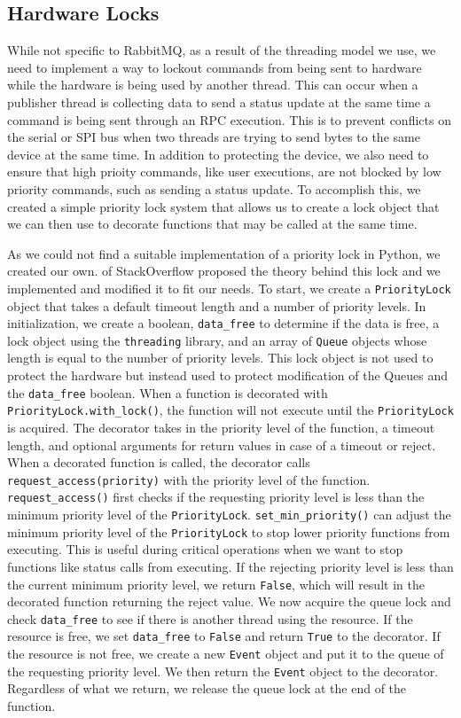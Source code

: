 \subsection{Hardware Locks}
While not specific to RabbitMQ, as a result of the threading model we use, we need to implement a way to lockout commands from being sent to hardware while the hardware is being used by another thread. 
This can occur when a publisher thread is collecting data to send a status update at the same time a command is being sent through an RPC execution.
This is to prevent conflicts on the serial or SPI bus when two threads are trying to send bytes to the same device at the same time.
In addition to protecting the device, we also need to ensure that high prioity commands, like user executions, are not blocked by low priority commands, such as sending a status update.
To accomplish this, we created a simple priority lock system that allows us to create a lock object that we can then use to decorate functions that may be called at the same time.

As we could not find a suitable implementation of a priority lock in Python, we created our own.
\cite{prioritylock} of StackOverflow proposed the theory behind this lock and we implemented and modified it to fit our needs.
To start, we create a \texttt{PriorityLock} object that takes a default timeout length and a number of priority levels.
In initialization, we create a boolean, \texttt{data\_free} to determine if the data is free, a lock object using the \texttt{threading} library, and an array of \texttt{Queue} objects whose length is equal to the number of priority levels.
This lock object is not used to protect the hardware but instead used to protect modification of the Queues and the \texttt{data\_free} boolean.
When a function is decorated with \texttt{PriorityLock.with\_lock()}, the function will not execute until the \texttt{PriorityLock} is acquired.
The decorator takes in the priority level of the function, a timeout length, and optional arguments for return values in case of a timeout or reject. 
When a decorated function is called, the decorator calls \texttt{request\_access(priority)} with the priority level of the function.
\texttt{request\_access()} first checks if the requesting priority level is less than the minimum priority level of the \texttt{PriorityLock}.
\texttt{set\_min\_priority()} can adjust the minimum priority level of the \texttt{PriorityLock} to stop lower priority functions from executing.
This is useful during critical operations when we want to stop functions like status calls from executing.
If the rejecting priority level is less than the current minimum priority level, we return \texttt{False}, which will result in the decorated function returning the reject value.
We now acquire the queue lock and check \texttt{data\_free} to see if there is another thread using the resource. 
If the resource is free, we set \texttt{data\_free} to \texttt{False} and return \texttt{True} to the decorator.
If the resource is not free, we create a new \texttt{Event} object and put it to the queue of the requesting priority level.
We then return the \texttt{Event} object to the decorator.
Regardless of what we return, we release the queue lock at the end of the function.

